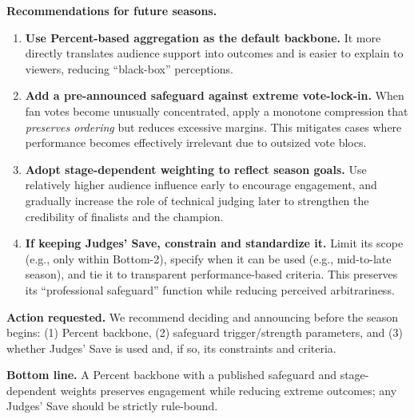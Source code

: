 {\begin{minipage}{0.97\textwidth}
\noindent\textbf{Recommendations for future seasons.}
\begin{enumerate}
    \item \textbf{Use Percent-based aggregation as the default backbone.}
    It more directly translates audience support into outcomes and is easier to explain to viewers, reducing “black-box” perceptions.

    \item \textbf{Add a pre-announced safeguard against extreme vote-lock-in.}
    When fan votes become unusually concentrated, apply a monotone compression that \emph{preserves ordering} but reduces excessive margins. This mitigates cases where performance becomes effectively irrelevant due to outsized vote blocs.

    \item \textbf{Adopt stage-dependent weighting to reflect season goals.}
    Use relatively higher audience influence early to encourage engagement, and gradually increase the role of technical judging later to strengthen the credibility of finalists and the champion.

    \item \textbf{If keeping Judges’ Save, constrain and standardize it.}
    Limit its scope (e.g., only within Bottom-2), specify when it can be used (e.g., mid-to-late season), and tie it to transparent performance-based criteria. This preserves its “professional safeguard” function while reducing perceived arbitrariness.
\end{enumerate}

\vspace{0.4em}

\noindent\textbf{Action requested.}
We recommend deciding and announcing before the season begins: (1) Percent backbone, (2) safeguard trigger/strength parameters, and (3) whether Judges’ Save is used and, if so, its constraints and criteria.

\vspace{0.4em}

\noindent\textbf{Bottom line.}
A Percent backbone with a published safeguard and stage-dependent weights preserves engagement while reducing extreme outcomes; any Judges’ Save should be strictly rule-bound.

\endgroup
\end{minipage}}

